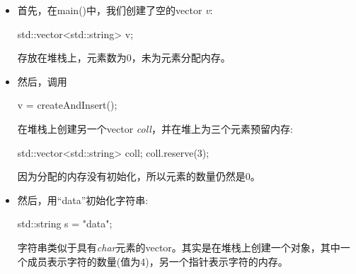 \begin{itemize}
	\item 首先，在main()中，我们创建了空的vector \textit{v}:
\begin{cppcode}
std::vector<std::string> v;
\end{cppcode}
	存放在堆栈上，元素数为0，未为元素分配内存。
	\item 然后，调用
\begin{cppcode}
v = createAndInsert();
\end{cppcode}
	在堆栈上创建另一个vector \textit{coll}，并在堆上为三个元素预留内存:
\begin{cppcode}
std::vector<std::string> coll;
coll.reserve(3);
\end{cppcode}
	因为分配的内存没有初始化，所以元素的数量仍然是0。
	\item 然后，用“data”初始化字符串:
\begin{cppcode}
std::string s = "data";
\end{cppcode}
	字符串类似于具有\textit{char}元素的vector。其实是在堆栈上创建一个对象，其中一个成员表示字符的数量(值为4)，另一个指针表示字符的内存。


\end{itemize}
